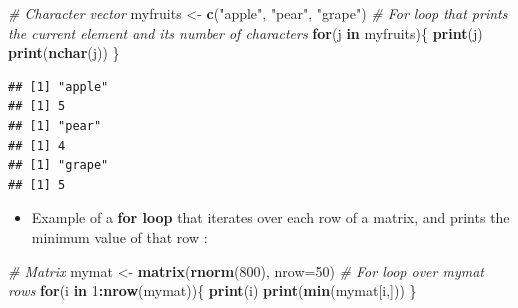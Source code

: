 \documentclass[]{book}
\newenvironment{Shaded}{\begin{snugshade}}{\end{snugshade}}
\newcommand{\CommentTok}[1]{\textcolor[rgb]{0.56,0.35,0.01}{\textit{#1}}}
\newcommand{\ControlFlowTok}[1]{\textcolor[rgb]{0.13,0.29,0.53}{\textbf{#1}}}
\newcommand{\DataTypeTok}[1]{\textcolor[rgb]{0.13,0.29,0.53}{#1}}
\newcommand{\DecValTok}[1]{\textcolor[rgb]{0.00,0.00,0.81}{#1}}
\newcommand{\KeywordTok}[1]{\textcolor[rgb]{0.13,0.29,0.53}{\textbf{#1}}}
\newcommand{\NormalTok}[1]{#1}
\newcommand{\OperatorTok}[1]{\textcolor[rgb]{0.81,0.36,0.00}{\textbf{#1}}}
\newcommand{\StringTok}[1]{\textcolor[rgb]{0.31,0.60,0.02}{#1}}
\providecommand{\tightlist}{%
  \setlength{\itemsep}{0pt}\setlength{\parskip}{0pt}}
\begin{document}
\begin{Shaded}
\begin{Highlighting}[]
\CommentTok{# Character vector}
\NormalTok{myfruits <-}\StringTok{ }\KeywordTok{c}\NormalTok{(}\StringTok{"apple"}\NormalTok{, }\StringTok{"pear"}\NormalTok{, }\StringTok{"grape"}\NormalTok{)}
\CommentTok{# For loop that prints the current element and its number of characters}
\ControlFlowTok{for}\NormalTok{(j }\ControlFlowTok{in}\NormalTok{ myfruits)\{}
    \KeywordTok{print}\NormalTok{(j)}
    \KeywordTok{print}\NormalTok{(}\KeywordTok{nchar}\NormalTok{(j))}
\NormalTok{\}}
\end{Highlighting}
\end{Shaded}

\begin{verbatim}
## [1] "apple"
## [1] 5
## [1] "pear"
## [1] 4
## [1] "grape"
## [1] 5
\end{verbatim}

\begin{itemize}
\tightlist
\item
  Example of a \textbf{for loop} that iterates over each row of a matrix, and prints the minimum value of that row :
\end{itemize}

\begin{Shaded}
\begin{Highlighting}[]
\CommentTok{# Matrix}
\NormalTok{mymat <-}\StringTok{ }\KeywordTok{matrix}\NormalTok{(}\KeywordTok{rnorm}\NormalTok{(}\DecValTok{800}\NormalTok{), }
    \DataTypeTok{nrow=}\DecValTok{50}\NormalTok{)}
\CommentTok{# For loop over mymat rows}
\ControlFlowTok{for}\NormalTok{(i }\ControlFlowTok{in} \DecValTok{1}\OperatorTok{:}\KeywordTok{nrow}\NormalTok{(mymat))\{}
    \KeywordTok{print}\NormalTok{(i)}
    \KeywordTok{print}\NormalTok{(}\KeywordTok{min}\NormalTok{(mymat[i,]))}
\NormalTok{\}}
\end{Highlighting}
\end{Shaded}
\end{document}
